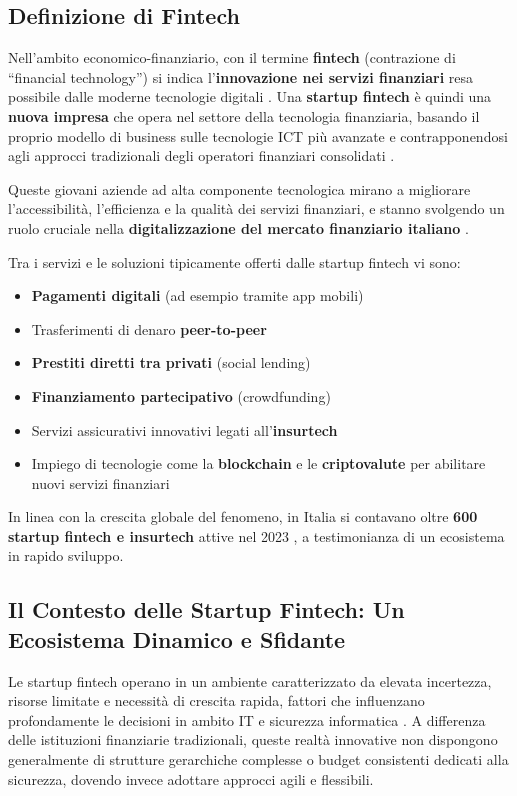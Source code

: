 \documentclass[a4paper,12pt]{report}
\begin{document}
\subsection*{Definizione di Fintech}

Nell'ambito economico-finanziario, con il termine \textbf{fintech} (contrazione di ``financial technology'') si indica l'\textbf{innovazione nei servizi finanziari} resa possibile dalle moderne tecnologie digitali \cite{tecnofinanza}. Una \textbf{startup fintech} è quindi una \textbf{nuova impresa} che opera nel settore della tecnologia finanziaria, basando il proprio modello di business sulle tecnologie ICT più avanzate e contrapponendosi agli approcci tradizionali degli operatori finanziari consolidati \cite{fintech_numeri}. 

Queste giovani aziende ad alta componente tecnologica mirano a migliorare l'accessibilità, l'efficienza e la qualità dei servizi finanziari, e stanno svolgendo un ruolo cruciale nella \textbf{digitalizzazione del mercato finanziario italiano} \cite{tecnofinanza}. 

Tra i servizi e le soluzioni tipicamente offerti dalle startup fintech vi sono:
\begin{itemize}
    \item \textbf{Pagamenti digitali} (ad esempio tramite app mobili)
    \item Trasferimenti di denaro \textbf{peer-to-peer}
    \item \textbf{Prestiti diretti tra privati} (social lending)
    \item \textbf{Finanziamento partecipativo} (crowdfunding)
    \item Servizi assicurativi innovativi legati all'\textbf{insurtech}
    \item Impiego di tecnologie come la \textbf{blockchain} e le \textbf{criptovalute} per abilitare nuovi servizi finanziari
\end{itemize}

In linea con la crescita globale del fenomeno, in Italia si contavano oltre \textbf{600 startup fintech e insurtech} attive nel 2023 \cite{fintech_numeri}, a testimonianza di un ecosistema in rapido sviluppo.
\subsection*{Il Contesto delle Startup Fintech: Un Ecosistema Dinamico e Sfidante}

Le startup fintech operano in un ambiente caratterizzato da elevata incertezza, risorse limitate e necessità di crescita rapida, fattori che influenzano profondamente le decisioni in ambito IT e sicurezza informatica \cite{fintechChallenges}. A differenza delle istituzioni finanziarie tradizionali, queste realtà innovative non dispongono generalmente di strutture gerarchiche complesse o budget consistenti dedicati alla sicurezza, dovendo invece adottare approcci agili e flessibili.
\end{document}
